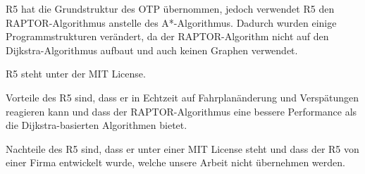 R5 hat die Grundstruktur des OTP übernommen, jedoch verwendet R5 den RAPTOR-Algorithmus anstelle des A*-Algorithmus. Dadurch wurden einige Programmstrukturen verändert, da der RAPTOR-Algorithm nicht auf den Dijkstra-Algorithmus aufbaut und auch keinen Graphen verwendet. ~\cite{r5_git}

R5 steht unter der MIT License. 

Vorteile des R5 sind, dass er in Echtzeit auf Fahrplanänderung und Verspätungen reagieren kann und dass der RAPTOR-Algorithmus eine bessere Performance als die Dijkstra-basierten Algorithmen bietet. 

Nachteile des R5 sind, dass er unter einer MIT License steht und dass der R5 von einer Firma entwickelt wurde, welche unsere Arbeit nicht übernehmen werden.
